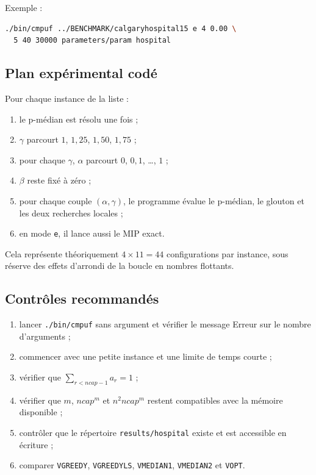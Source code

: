 \documentclass[11pt,a4paper]{article}
\newcommand{\code}[1]{\texttt{#1}}
\begin{document}
Exemple :
\begin{lstlisting}[language=bash]
./bin/cmpuf ../BENCHMARK/calgaryhospital15 e 4 0.00 \
  5 40 30000 parameters/param hospital
\end{lstlisting}

\subsection{Plan expérimental codé}

Pour chaque instance de la liste :
\begin{enumerate}
  \item le p-médian est résolu une fois ;
  \item $\gamma$ parcourt $1$, $1{,}25$, $1{,}50$, $1{,}75$ ;
  \item pour chaque $\gamma$, $\alpha$ parcourt $0$, $0{,}1$, \ldots, $1$ ;
  \item $\beta$ reste fixé à zéro ;
  \item pour chaque couple $(\alpha,\gamma)$, le programme évalue le
        p-médian, le glouton et les deux recherches locales ;
  \item en mode \code{e}, il lance aussi le MIP exact.
\end{enumerate}

Cela représente théoriquement $4\times 11=44$ configurations par instance,
sous réserve des effets d'arrondi de la boucle en nombres flottants.

\subsection{Contrôles recommandés}

\begin{enumerate}
  \item lancer \code{./bin/cmpuf} sans argument et vérifier le message
        \og Erreur sur le nombre d'arguments \fg ;
  \item commencer avec une petite instance et une limite de temps courte ;
  \item vérifier que $\sum_{r<ncap-1}a_r=1$ ;
  \item vérifier que $m$, $ncap^m$ et $n^2ncap^m$ restent compatibles avec la
        mémoire disponible ;
  \item contrôler que le répertoire \code{results/hospital} existe et est
        accessible en écriture ;
  \item comparer \code{VGREEDY}, \code{VGREEDYLS}, \code{VMEDIAN1},
        \code{VMEDIAN2} et \code{VOPT}.
\end{enumerate}
\end{document}
